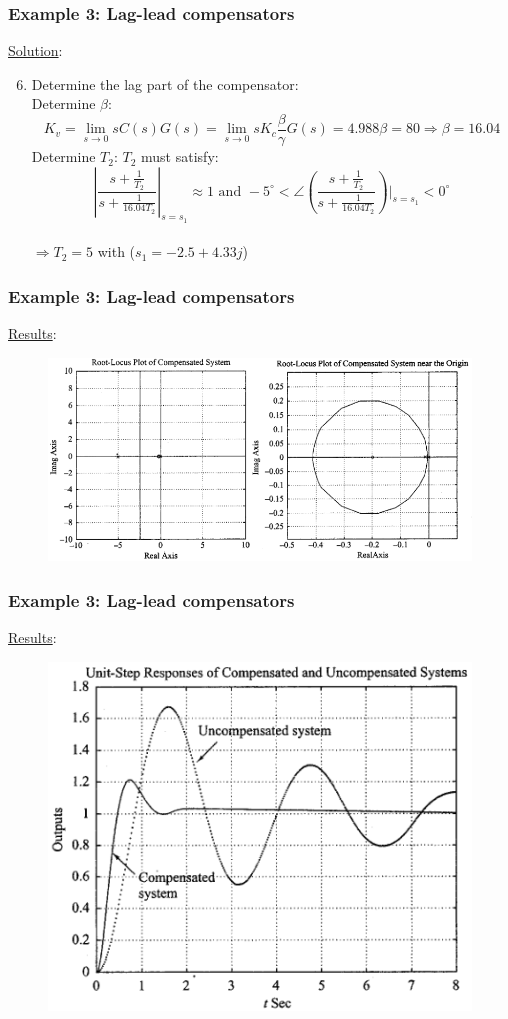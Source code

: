 \begin{frame}
	\frametitle{Example 3: Lag-lead compensators}
	\underline{Solution}:
	\begin{enumerate}
		\setcounter{enumi}{5}
		\item Determine the lag part of the compensator:\\
		Determine $\beta$:
		$$K_v=\lim_{s \to 0}sC(s)G(s)=\lim_{s\to0}sK_c\frac{\beta}{\gamma}G(s)=4.988\beta=80 \Rightarrow \beta=16.04$$
		Determine $T_2$: $T_2$ must satisfy:
		$$|\frac{s+\frac{1}{T_2}}{s+\frac{1}{16.04T_2}}|_{s=s_1}\approx1 \text{ and } -5^{\circ}<\angle(\frac{s+\frac{1}{T_2}}{s+\frac{1}{16.04T_2}})|_{s=s_1}<0^{\circ}$$\\
		 $\Rightarrow T_2=5$ with ($s_1=-2.5+4.33j$)
	\end{enumerate}
\end{frame}

\begin{frame}
	\frametitle{Example 3: Lag-lead compensators}
	\underline{Results}:\\
	\begin{figure}
		\centering
		\includegraphics[width=1\linewidth]{Ex3_rootlocus}
	\end{figure}
\end{frame}

\begin{frame}
	\frametitle{Example 3: Lag-lead compensators}
	\underline{Results}:\\
	\begin{figure}
		\centering
		\includegraphics[width=0.65\linewidth]{Ex3_response}
	\end{figure}
\end{frame}

